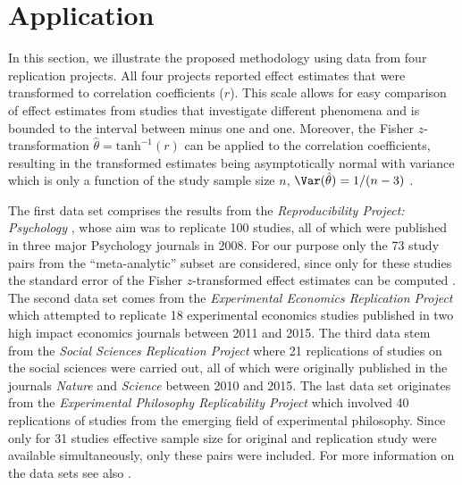 \section{Application}\label{sec1:application}
In this section, we illustrate the proposed methodology using data from four
replication projects. All four projects reported effect estimates that were
transformed to correlation coefficients ($r$). This scale allows for easy
comparison of effect estimates from studies that investigate different phenomena
and is bounded to the interval between minus one and one. Moreover, the Fisher
$z$-transformation $\hat{\theta} = \text{tanh}^{-1}(r)$ can be applied to the
correlation coefficients, resulting in the transformed estimates being
asymptotically normal with variance which is only a function of the study sample
size $n$, \ie{} $\Var(\hat{\theta}) = 1/(n - 3)$ \citep{Fisher1921}.



The first data set comprises the results from the \textit{Reproducibility
  Project: Psychology} \citep{Opensc2015}, whose aim was to replicate 100
studies, all of which were published in three major Psychology journals in 2008.
For our purpose only the 73 study pairs from the ``meta-analytic'' subset are
considered, since only for these studies the standard error of the Fisher
$z$-transformed effect estimates can be computed \citep{Johnson2016}. The second
data set comes from the \textit{Experimental Economics Replication Project}
\citep{Camerer2016} which attempted to replicate 18 experimental economics
studies published in two high impact economics journals between 2011 and 2015.
The third data stem from the \textit{Social Sciences Replication Project}
\citep{Camerer2018} where 21 replications of studies on the social sciences were
carried out, all of which were originally published in the journals
\textit{Nature} and \textit{Science} between 2010 and 2015. The last data set
originates from the \textit{Experimental Philosophy Replicability Project}
\citep{Cova2018} which involved 40 replications of studies from the emerging
field of experimental philosophy. Since only for 31 studies effective sample
size for original and replication study were available simultaneously, only
these pairs were included. For more information on the data sets see also
\citet{Pawel2020}.

